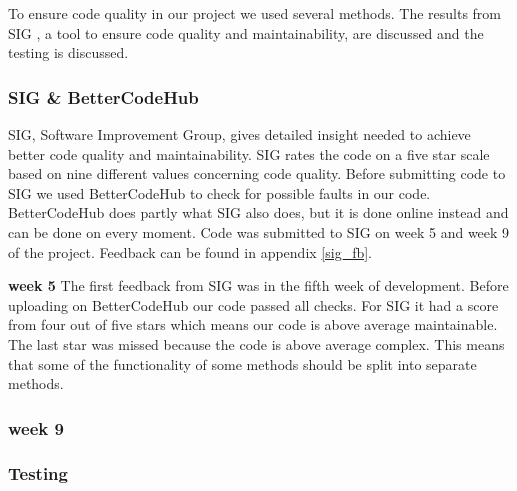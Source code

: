 To ensure code quality in our project we used several methods. The results from SIG \cite{sig}, a tool to ensure code quality and maintainability, are discussed and the testing is discussed.



\subsubsection{SIG \& BetterCodeHub}
SIG, Software Improvement Group, gives detailed insight needed to achieve better code quality and maintainability. SIG rates the code on a five star scale based on nine different values concerning code quality. Before submitting code to SIG we used BetterCodeHub\cite{better_code_hub} to check for possible faults in our code. BetterCodeHub does partly what SIG also does, but it is done online instead and can be done on every moment. Code was submitted to SIG on week 5 and week 9 of the project. Feedback can be found in appendix \ref{sig_fb}.

\textbf{week 5}
The first feedback from SIG was in the fifth week of development. Before uploading on BetterCodeHub our code passed all checks. For SIG it had a score from four out of five stars which means our code is above average maintainable. The last star was missed because the code is above average complex. This means that some of the functionality of some methods should be split into separate methods.

\subsubsection{week 9}

\subsubsection{Testing}
